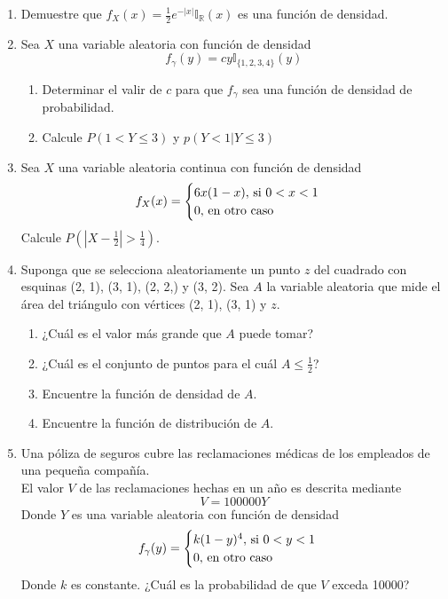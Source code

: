 \documentclass[12pt,a4paper]{report}
\begin{document}
\begin{enumerate}
		\item {
			Demuestre que $f_X(x) = \frac{1}{2}e^{-|x|}\mathbb{I}_\mathbb{R}(x)$ es
			una función de densidad.
		}
		
		\item {
			Sea $X$ una variable aleatoria con función de densidad
				\[f_\gamma(y) = cy \mathbb{I}_{\{1, 2, 3, 4\}}(y)\]
				\begin{enumerate}
					\item {
						Determinar el valir de $c$ para que $f_\gamma$ sea una función de
						densidad de probabilidad.
					}
					\item {
						Calcule $P(1 < Y \leq 3)$ y $p(Y < 1 | Y \leq 3)$
					}
				\end{enumerate}
		}
		
		\item {
			Sea $X$ una variable aleatoria continua con función de densidad
				\[
					f_X(x) = \begin{cases}
										6x(1-x), $ si $ 0 < x < 1\\
										0, $ en otro caso$
									 \end{cases}
				\]
			Calcule $P(|X-\frac{1}{2}| > \frac{1}{4})$.
		}
		
		\item {
			Suponga que se selecciona aleatoriamente un punto $z$ del cuadrado con
			esquinas (2, 1), (3, 1), (2, 2,) y (3, 2). Sea $A$ la variable aleatoria
			que mide el área del triángulo con vértices (2, 1), (3, 1) y $z$.
			\begin{enumerate}
				\item {
					¿Cuál es el valor más grande que $A$ puede tomar?
				}
				\item {
					¿Cuál es el conjunto de puntos para el cuál $A \leq \frac{1}{2}$?
				}
				\item {
					Encuentre la función de densidad de $A$.
				}
				\item {
					Encuentre la función de distribución de $A$.
				}
			\end{enumerate}
		}
		
		\item {
			Una póliza de seguros cubre las reclamaciones médicas de los empleados
			de una pequeña compañía.\\
			El valor $V$ de las reclamaciones hechas en un año es descrita mediante
			\[V = 100000Y\]
			Donde $Y$ es una variable aleatoria con función de densidad
			\[
				f_\gamma(y) = \begin{cases}
												k(1-y)^4, $ si $ 0 < y < 1\\
												0, $ en otro caso$
											\end{cases}
			\]
			Donde $k$ es constante. ¿Cuál es la probabilidad de que $V$ exceda 10000?
			}
			

\end{enumerate}
\end{document}

